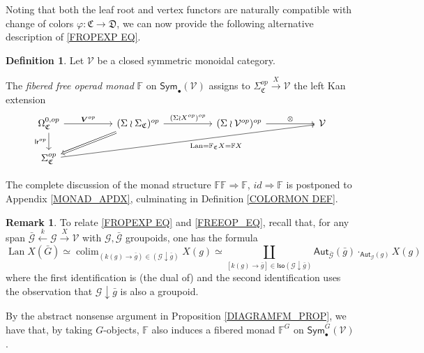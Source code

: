 \documentclass[a4paper,10pt
,draft
]{article}%
\numberwithin{equation}{section}
\numberwithin{figure}{section}
\theoremstyle{definition} %
\newtheorem{definition}[equation]{Definition}%
\newtheorem{remark}[equation]{Remark}%
\DeclareMathOperator{\colim}{colim}%
\DeclareMathOperator{\Lan}{Lan}%
\newcommand{\V}{\ensuremath{\mathcal V}}
\newcommand{\1}{\ensuremath{\mathbbm 1}}%
\begin{document}
Noting that both the leaf root and vertex functors are naturally compatible with change of colors 
$\varphi \colon \mathfrak{C} \to \mathfrak{D}$, 
we can now provide the following alternative 
description of \eqref{FROPEXP EQ}.



\begin{definition}\label{FREEOP DEF}
Let $\mathcal{V}$ be a closed symmetric monoidal category.

The \textit{fibered free operad monad} $\mathbb{F}$ on $\mathsf{Sym}_\bullet(\mathcal{V})$ 
assigns to 
$\Sigma_{\mathfrak{C}}^{op} \xrightarrow{X} \mathcal{V}$
the left Kan extension
\begin{equation}\label{FREEOP_EQ}
\begin{tikzcd}[column sep = 50pt]
	\Omega^{0,op}_{\mathfrak{C}}
	\arrow[d, "\mathsf{lr}^{op}"']
	\arrow[r, "\boldsymbol{V}^{op}"]
&
	(\Sigma \wr \Sigma_{\mathfrak{C}})^{op} \arrow[r, "(\Sigma \wr X^{op})^{op}"]
	\arrow[dl, Rightarrow]
&
	(\Sigma \wr \V^{op})^{op} \arrow[r, "\otimes"]
&
	\V
\\
	\Sigma^{op}_{\mathfrak{C}}
	\arrow[urrr, "\Lan = \mathbb F_{\mathfrak{C}} X = \mathbb F X"']
\end{tikzcd}
\end{equation}
\end{definition}
The complete discussion of the monad structure
$\mathbb{F}\mathbb{F} \Rightarrow \mathbb{F}$,
$id \Rightarrow \mathbb{F}$ is postponed to Appendix \ref{MONAD_APDX},
culminating in Definition \ref{COLORMON DEF}.


\begin{remark}\label{CONVER REM}
To relate \eqref{FROPEXP EQ} and \eqref{FREEOP_EQ}, recall that, 
for any span 
$\bar{\mathcal{G}} \overset{k}{\leftarrow} \mathcal{G} \xrightarrow{X} \mathcal{V}$
with $\mathcal{G},\bar{\mathcal{G}}$ groupoids,
one has the formula
\[\Lan X (\bar{G}) \simeq 
\colim_{(k(g) \to \bar{g})\in (\mathcal{G} \downarrow \bar{g})} X(g) \simeq
\coprod_{[k(g) \to \bar{g}] 
\in \mathsf{Iso}(\mathcal{G} \downarrow \bar{g})}
\mathsf{Aut}_{\bar{\mathcal{G}}}(\bar{g})
\cdot_{\mathsf{Aut}_{\mathcal{G}}(g)}
X(g)
\]
where the first identification is
(the dual of) \cite[Thm. 1.3.5]{Ri14}
and the second identification uses the observation that
$\mathcal{G} \downarrow \bar{g}$ is also a groupoid.
\end{remark}


By the abstract nonsense argument in 
Proposition \ref{DIAGRAMFM_PROP},
we have that, by taking $G$-objects, 
$\mathbb{F}$ also induces a fibered monad 
$\mathbb{F}^G$ on $\mathsf{Sym}^G_{\bullet}(\V)$.
\end{document}

